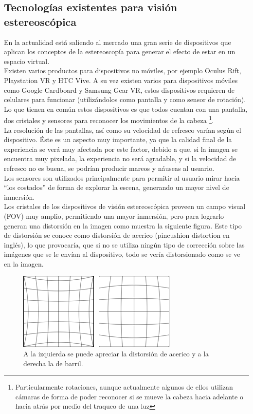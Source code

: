 \documentclass[12pt]{article}
\begin{document}
\subsection{Tecnologías existentes para visión estereoscópica}
En la actualidad está saliendo al mercado una gran serie de dispositivos que aplican los conceptos de la estereoscopía para generar el efecto de estar en un espacio virtual.
\\Existen varios productos para dispositivos no móviles, por ejemplo  Oculus Rift\cite{oculus}, Playstation VR\cite{psvr} y HTC Vive\cite{htcvive}. A su vez existen varios para dispositivos móviles como  Google Cardboard\cite{cardboard} y  Samsung Gear VR\cite{samsungvr}, estos dispositivos requieren de celulares para funcionar (utilizándolos como pantalla y como sensor de rotación).
\\Lo que tienen en común estos dispositivos es que todos cuentan con una pantalla, dos cristales y sensores para reconocer los movimientos de la cabeza \footnote{Particularmente rotaciones, aunque actualmente algunos de ellos utilizan cámaras de forma de poder reconocer si se mueve la cabeza hacia adelante o hacia atrás por medio del traqueo de una luz}.
\\La resolución de las pantallas, así como su velocidad de refresco varían según el dispositivo. Éste es un aspecto muy importante, ya que la calidad final de la experiencia se verá muy afectada por este factor, debido a que, si la imagen se encuentra muy pixelada, la experiencia no será agradable, y si la velocidad de refresco no es buena, se podrían producir mareos y náuseas al usuario.
\\Los sensores son utilizados principalmente para permitir al usuario mirar hacia “los costados” de forma de explorar la escena, generando un mayor nivel de inmersión.
\\Los cristales de los dispositivos de visión estereoscópica proveen un campo visual (FOV) muy amplio, permitiendo una mayor inmersión, pero para lograrlo generan una distorsión\cite{oculusrendering} en la imagen como muestra la siguiente figura. Este tipo de distorsión se conoce como  distorsión de acerico (pincushion distortion en inglés), lo que provocaría, que si no se utiliza ningún tipo de corrección sobre las imágenes que se le envían al dispositivo, todo se vería distorsionado como se ve en la imagen.
\begin{figure}[h!]
\includegraphics[width =0.6\linewidth, center]{ace-bar.png}
\caption{ A la izquierda se puede apreciar la distorsión de acerico y a la derecha la de barril.}
\label{ fig : surface }
\end{figure}
\end{document}
